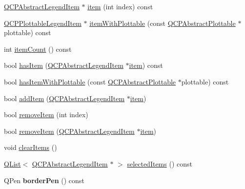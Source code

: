\begin{DoxyCompactItemize}
\item 
\hyperlink{class_q_c_p_abstract_legend_item}{Q\+C\+P\+Abstract\+Legend\+Item} $\ast$ \hyperlink{class_q_c_p_legend_a454272d7094437beb3278a2294006da5}{item} (int index) const 
\item 
\hyperlink{class_q_c_p_plottable_legend_item}{Q\+C\+P\+Plottable\+Legend\+Item} $\ast$ \hyperlink{class_q_c_p_legend_a5ee80cf83f65e3b6dd386942ee3cc1ee}{item\+With\+Plottable} (const \hyperlink{class_q_c_p_abstract_plottable}{Q\+C\+P\+Abstract\+Plottable} $\ast$plottable) const 
\item 
int \hyperlink{class_q_c_p_legend_a198228e9cdc78d3a3c306fa6763d0404}{item\+Count} () const 
\item 
bool \hyperlink{class_q_c_p_legend_a380dd19eb631592e1ebb9b24cc5b398a}{has\+Item} (\hyperlink{class_q_c_p_abstract_legend_item}{Q\+C\+P\+Abstract\+Legend\+Item} $\ast$\hyperlink{class_q_c_p_legend_a454272d7094437beb3278a2294006da5}{item}) const 
\item 
bool \hyperlink{class_q_c_p_legend_a2eb1d24bdf5658e64962a656303fd61a}{has\+Item\+With\+Plottable} (const \hyperlink{class_q_c_p_abstract_plottable}{Q\+C\+P\+Abstract\+Plottable} $\ast$plottable) const 
\item 
bool \hyperlink{class_q_c_p_legend_a3ab274de52d2951faea45a6d975e6b3f}{add\+Item} (\hyperlink{class_q_c_p_abstract_legend_item}{Q\+C\+P\+Abstract\+Legend\+Item} $\ast$\hyperlink{class_q_c_p_legend_a454272d7094437beb3278a2294006da5}{item})
\item 
bool \hyperlink{class_q_c_p_legend_ac91595c3eaa746fe6321d2eb952c63bb}{remove\+Item} (int index)
\item 
bool \hyperlink{class_q_c_p_legend_a2aea4ec6da2d454dd0b241a254d65082}{remove\+Item} (\hyperlink{class_q_c_p_abstract_legend_item}{Q\+C\+P\+Abstract\+Legend\+Item} $\ast$\hyperlink{class_q_c_p_legend_a454272d7094437beb3278a2294006da5}{item})
\item 
void \hyperlink{class_q_c_p_legend_a24795c7250eb5214fcea16b7217b4dfb}{clear\+Items} ()
\item 
\hyperlink{class_q_list}{Q\+List}$<$ \hyperlink{class_q_c_p_abstract_legend_item}{Q\+C\+P\+Abstract\+Legend\+Item} $\ast$ $>$ \hyperlink{class_q_c_p_legend_ac93eaf236e911d67aa8b88942ef45c5e}{selected\+Items} () const 
\item 
Q\+Pen {\bfseries border\+Pen} () const \hypertarget{class_q_c_p_legend_a8ffd92df86ddf43696d95f04a20e3226}{}\label{class_q_c_p_legend_a8ffd92df86ddf43696d95f04a20e3226}


\end{DoxyCompactItemize}
